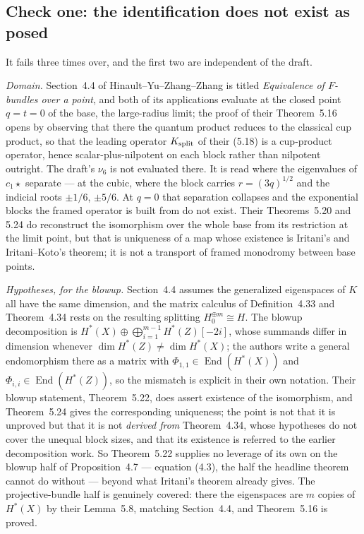 \documentclass[11pt]{article}
\theoremstyle{definition}
\theoremstyle{remark}
\begin{document}
\subsection*{Check one: the identification does not exist as posed}

It fails three times over, and the first two are independent of the draft.

\emph{Domain.} Section~4.4 of Hinault--Yu--Zhang--Zhang is titled
\emph{Equivalence of $F$-bundles over a point}, and both of its applications
evaluate at the closed point $q=t=0$ of the base, the large-radius limit; the
proof of their Theorem~5.16 opens by observing that there the quantum product
reduces to the classical cup product, so that the leading operator $K_{\rm
split}$ of their (5.18) is a cup-product operator, hence scalar-plus-nilpotent
on each block rather than nilpotent outright. The
draft's $\nu_6$ is not evaluated there. It is read where the eigenvalues of
$c_1\star$ separate --- at the cubic, where the block carries $r=(3q)^{1/2}$ and
the indicial roots $\pm1/6$, $\pm5/6$. At $q=0$ that separation collapses and
the exponential blocks the framed operator is built from do not exist. Their
Theorems~5.20 and 5.24 do reconstruct the isomorphism over the whole base from
its restriction at the limit point, but that is uniqueness of a map whose
existence is Iritani's and Iritani--Koto's theorem; it is not a transport of
framed monodromy between base points.

\emph{Hypotheses, for the blowup.} Section~4.4 assumes the generalized
eigenspaces of $K$ all have the same dimension, and the matrix calculus of
Definition~4.33 and Theorem~4.34 rests on the resulting splitting
$H_0^{\oplus m}\cong H$. The blowup decomposition is
$H^*(X)\oplus\bigoplus_{i=1}^{m-1}H^*(Z)[-2i]$, whose summands differ in
dimension whenever $\dim H^*(Z)\ne\dim H^*(X)$; the authors write a general
endomorphism there as a matrix with $\Phi_{1,1}\in\operatorname{End}(H^*(X))$
and $\Phi_{i,i}\in\operatorname{End}(H^*(Z))$, so the mismatch is explicit in
their own notation. Their blowup statement, Theorem~5.22, does assert existence
of the isomorphism, and Theorem~5.24 gives the corresponding uniqueness; the
point is not that it is unproved but that it is not \emph{derived from}
Theorem~4.34, whose hypotheses do not cover the unequal block sizes, and that
its existence is referred to the earlier decomposition work. So Theorem~5.22
supplies no leverage of its own on the blowup half of Proposition~4.7 ---
equation (4.3), the half the headline theorem cannot do without --- beyond what
Iritani's theorem already gives. The projective-bundle half is genuinely covered:
there the eigenspaces are $m$ copies of $H^*(X)$ by their Lemma~5.8, matching
Section~4.4, and Theorem~5.16 is proved.
\end{document}
